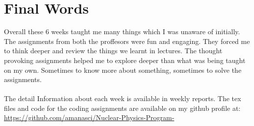 \documentclass[a4paper]{article}
\begin{document}
\section{Final Words}
Overall these 6 weeks taught me many things which I was unaware of initially. The assignments from both the proffesors were fun and engaging. They forced me to think deeper and review the things we learnt in lectures.
The thought provoking assignments helped me to explore deeper than what was being taught on my own. Sometimes to know more about something, sometimes to solve the assignments. 
\\ \\
The detail Information about each week is available in weekly reports. 
The tex files and code for the coding assignments are available on my github profile at: \href{https://github.com/amanasci/Nuclear-Physics-Program-}{https://github.com/amanasci/Nuclear-Physics-Program-}
\end{document}

